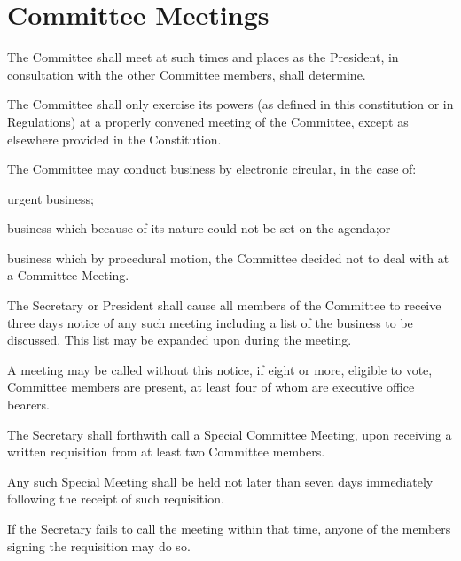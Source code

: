 \documentclass[a4paper]{article}
\begin{document}
\section{Committee Meetings} \label{sec:committee_meetings}
\begin{myEnumerate}
    \item The Committee shall meet at such times and places as the President, in consultation with the other Committee members, shall determine.
    \item The Committee shall only exercise its powers (as defined in this constitution or in Regulations) at a properly convened meeting of the Committee, except as elsewhere provided in the Constitution.
    \item The Committee may conduct business by electronic circular, in the case of:
          \begin{myEnumerate}
              \item urgent business;
              \item business which because of its nature could not be set on the agenda;or
              \item business which by procedural motion, the Committee decided not to deal with at a Committee Meeting.
          \end{myEnumerate}
    \item The Secretary or President shall cause all members of the Committee to receive three days notice of any such meeting including a list of the business to be discussed. This list may be expanded upon during the meeting.
          \begin{myEnumerate}
              \item A meeting may be called without this notice, if eight or more, eligible to vote, Committee members are present, at least four of whom are executive office bearers.
          \end{myEnumerate}
    \item The Secretary shall forthwith call a Special Committee Meeting, upon receiving a written requisition from at least two Committee members.
          \begin{myEnumerate}
              \item Any such Special Meeting shall be held not later than seven days immediately following the receipt of such requisition.
                    \begin{myEnumerate}
                        \item If the Secretary fails to call the meeting within that time, anyone of the members signing the requisition may do so.

\end{myEnumerate}
\end{myEnumerate}
\end{myEnumerate}
\end{document}
